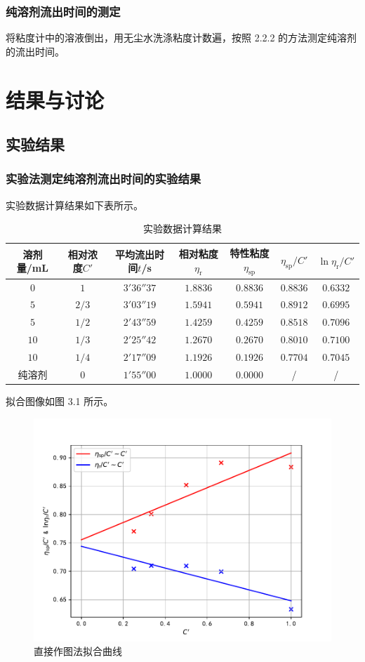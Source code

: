 \documentclass[12pt]{ctexart}
\numberwithin{equation}{section}
\begin{document}
\subsubsection{纯溶剂流出时间的测定}

将粘度计中的溶液倒出，用无尘水洗涤粘度计数遍，按照 2.2.2 的方法测定纯溶剂的流出时间。

\section{结果与讨论}
\subsection{实验结果}
\subsubsection{实验法测定纯溶剂流出时间的实验结果}

实验数据计算结果如下表所示。
\begin{longtable}{ccccccc}
    \caption{实验数据计算结果} \\
    \hline
    溶剂量/mL & 相对浓度$C'$ & 平均流出时间$t$/s & 相对粘度$\eta_\text{r}$ & 特性粘度$\eta_{\text{sp}}$ & $\eta_\text{sp}/C'$ & $\ln\eta_\text{r}/C'$ \\
    \hline
    $0$  & $ 1 $ & $3'36''37$ & $1.8836$ & $0.8836$ & $0.8836$ & $0.6332$ \\
    $5$  & $2/3$ & $3'03''19$ & $1.5941$ & $0.5941$ & $0.8912$ & $0.6995$ \\
    $5$  & $1/2$ & $2'43''59$ & $1.4259$ & $0.4259$ & $0.8518$ & $0.7096$ \\
    $10$ & $1/3$ & $2'25''42$ & $1.2670$ & $0.2670$ & $0.8010$ & $0.7100$ \\
    $10$ & $1/4$ & $2'17''09$ & $1.1926$ & $0.1926$ & $0.7704$ & $0.7045$ \\
    纯溶剂 & $0$ & $1'55''00$ & $1.0000$ & $0.0000$ & / & / \\
    \hline
\end{longtable}

拟合图像如图 3.1 所示。
\begin{figure}[!h]
    \centering
    \includegraphics[scale=0.8]{fitting1.pdf}
    \caption{直接作图法拟合曲线}
\end{figure}
\end{document}
